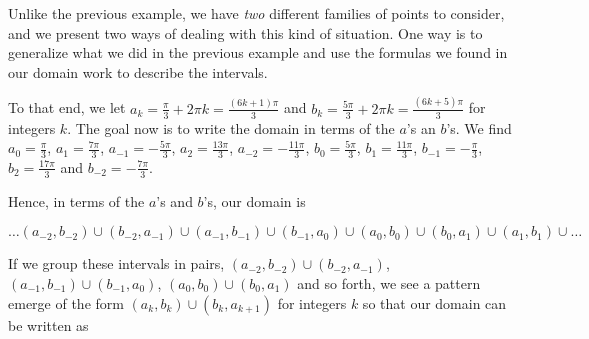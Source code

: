 \documentclass{ximera}
\begin{document}
\begin{example}
\begin{explanation}
\begin{enumerate}
\begin{image}
\end{image}

Unlike the previous example, we have \textit{two} different families of points to consider, and we present two ways of dealing with this kind of situation.  One way is to generalize what we did in the previous example and use the formulas we found in our domain work to describe the intervals. 

 

 To that end, we let  $a_k = \frac{\pi}{3} + 2\pi k = \frac{(6k+1)\pi}{3}$ and  $b_k = \frac{5\pi}{3} + 2\pi k = \frac{(6k+5) \pi}{3}$ for integers $k$.  The goal now is to write the domain in terms of the $a$'s an $b$'s.  We find $a_0 =  \frac{\pi}{3}$, $a_1 =  \frac{7\pi}{3}$,  $a_{-1} =  -\frac{5\pi}{3}$, $a_2 =  \frac{13\pi}{3}$, $a_{-2} =  -\frac{11\pi}{3}$, $b_0 =  \frac{5\pi}{3}$,  $b_1 =  \frac{11\pi}{3}$, $b_{-1} =  -\frac{\pi}{3}$,  $b_2 =  \frac{17\pi}{3}$  and $b_{-2} =  -\frac{7\pi}{3}$.  
 
  
 
 Hence, in terms of the $a$'s and $b$'s, our domain is

\[\ldots  \left(a_{-2}, b_{-2}  \right) \cup \left(b_{-2}, a_{-1}  \right)\cup \left(a_{-1}, b_{-1}  \right)\cup \left(b_{-1}, a_0  \right)\cup \left(a_0, b_0  \right)\cup \left(b_0, a_1  \right)\cup \left(a_1, b_1  \right)\cup \dots \]

If we group these intervals in pairs, $ \left(a_{-2}, b_{-2}  \right) \cup \left(b_{-2}, a_{-1}  \right)$, $\left(a_{-1}, b_{-1}  \right)\cup \left(b_{-1}, a_0  \right)$, $\left(a_0, b_0  \right)\cup \left(b_0, a_1  \right)$ and so forth, we see a pattern emerge of the form  $\left(a_k, b_k  \right)\cup \left(b_k, a_{k+1}  \right)$ for integers $k$ so that our domain can be written as 


\end{enumerate}
\end{explanation}
\end{example}
\end{document}
